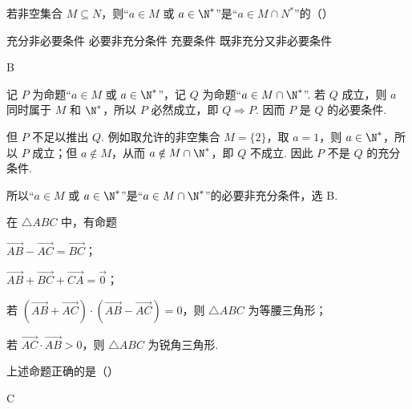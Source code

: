 \begin{problem}
若非空集合 \(M \subseteq N\)，则“\(a \in M\) 或 \(a \in \N^{*}\)”是“\(a \in M \cap N^{*}\)”的（\quad）

\choices
    {充分非必要条件}
    {必要非充分条件}
    {充要条件}
    {既非充分又非必要条件}
\end{problem}

\begin{answer}
B
\end{answer}

\begin{solution}
记 \(P\) 为命题“\(a\in M\) 或 \(a\in\N^{*}\)”，记 \(Q\) 为命题“\(a\in M\cap\N^{*}\)”.
若 \(Q\) 成立，则 \(a\) 同时属于 \(M\) 和 \(\N^{*}\)，所以 \(P\) 必然成立，即 \(Q\Rightarrow P\). 因而 \(P\) 是 \(Q\) 的必要条件.

但 \(P\) 不足以推出 \(Q\). 例如取允许的非空集合 \(M=\{2\}\)，取 \(a=1\)，则 \(a\in\N^{*}\)，所以 \(P\) 成立；但 \(a\notin M\)，从而 \(a\notin M\cap\N^{*}\)，即 \(Q\) 不成立. 因此 \(P\) 不是 \(Q\) 的充分条件.

所以“\(a\in M\) 或 \(a\in\N^{*}\)”是“\(a\in M\cap\N^{*}\)”的必要非充分条件，选 B.
\end{solution}

\begin{problem}
在 \(\triangle ABC\) 中，有命题

\begin{circlelist}
\item \(\overrightarrow{AB}-\overrightarrow{AC}=\overrightarrow{BC}\)；
\item \(\overrightarrow{AB}+\overrightarrow{BC}+\overrightarrow{CA}=\overrightarrow{0}\)；
\item 若 \((\overrightarrow{AB}+\overrightarrow{AC})\cdot(\overrightarrow{AB}-\overrightarrow{AC})=0\)，则 \(\triangle ABC\) 为等腰三角形；
\item 若 \(\overrightarrow{AC}\cdot\overrightarrow{AB}>0\)，则 \(\triangle ABC\) 为锐角三角形.
\end{circlelist}

上述命题正确的是（\quad）

\choices
    {}
    {}
    {}
    {}
\end{problem}

\begin{answer}
C
\end{answer}

